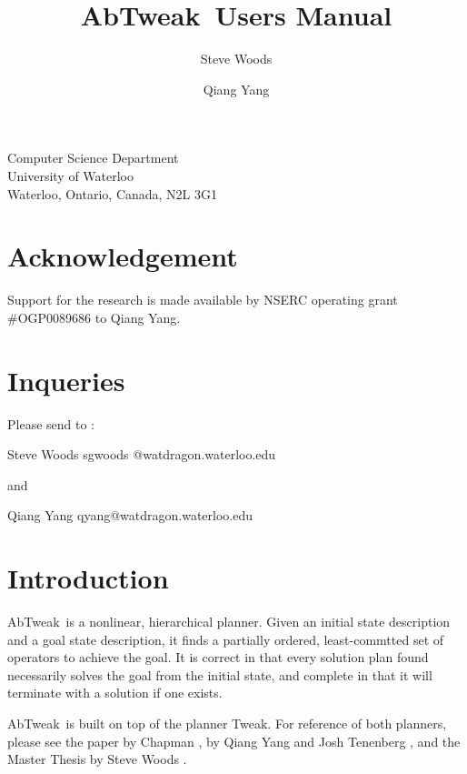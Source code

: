
\newcommand{\tweak}{{\sc Tweak}}
\newcommand{\sipe}{{\sc Sipe}}
\newcommand{\noah}{{\sc Noah}}
\newcommand{\nonlin}{{\sc Nonlin}}
\newcommand{\abtweak}{{\sc AbTweak\ }}

\title{\abtweak Users Manual}

\author{Steve Woods \and Qiang Yang}

\date{}



\maketitle
\begin{center}
Computer Science Department \\
University of Waterloo \\
Waterloo, Ontario, Canada, N2L 3G1\\ 
\end{center}

\section*{Acknowledgement}
Support for the research is made available by NSERC operating grant 
\#OGP0089686 to Qiang Yang.

\section*{Inqueries}
Please send to :

Steve Woods sgwoods @watdragon.waterloo.edu

and

Qiang Yang qyang@watdragon.waterloo.edu

\newpage

\section{Introduction}
\abtweak is a nonlinear, hierarchical planner.  Given an initial state description and a goal state description, it finds a partially ordered, least-commtted set of operators to achieve the goal.  It is correct in that every solution plan found necessarily solves the goal from the initial state, and complete in that it will terminate with a solution if one exists.

\abtweak is built on top of the planner Tweak.  For reference of both planners, please see the paper by Chapman \cite{tweak}, by Qiang Yang and Josh Tenenberg \cite{abtweak}, and the Master Thesis by Steve Woods \cite{thesis}.

